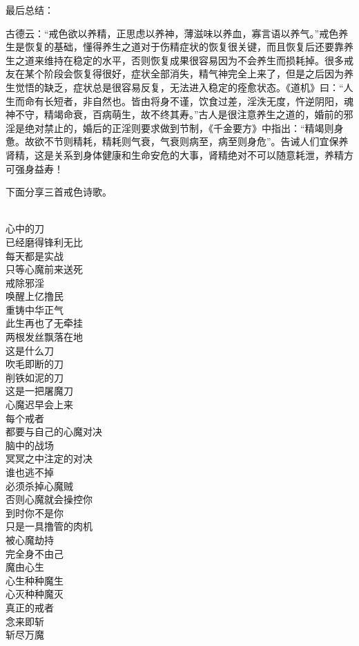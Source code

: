 最后总结：

古德云：“戒色欲以养精，正思虑以养神，薄滋味以养血，寡言语以养气。”戒色养生是恢复的基础，懂得养生之道对于伤精症状的恢复很关键，而且恢复后还要靠养生之道来维持在稳定的水平，否则恢复成果很容易因为不会养生而损耗掉。很多戒友在某个阶段会恢复得很好，症状全部消失，精气神完全上来了，但是之后因为养生觉悟的缺乏，症状总是很容易反复，无法进入稳定的痊愈状态。《道机》曰：“人生而命有长短者，非自然也。皆由将身不谨，饮食过差，淫泆无度，忤逆阴阳，魂神不守，精竭命衰，百病萌生，故不终其寿。”古人是很注意养生之道的，婚前的邪淫是绝对禁止的，婚后的正淫则要求做到节制，《千金要方》中指出：“精竭则身惫。故欲不节则精耗，精耗则气衰，气衰则病至，病至则身危”。告诫人们宜保养肾精，这是关系到身体健康和生命安危的大事，肾精绝对不可以随意耗泄，养精方可强身益寿！

下面分享三首戒色诗歌。

\begin{poem}
    \begin{multicols}{2}
        \begin{center}~\\
            心中的刀 \\ 已经磨得锋利无比 \\ 每天都是实战 \\ 只等心魔前来送死 \\ 戒除邪淫 \\ 唤醒上亿撸民 \\ 重铸中华正气 \\ 此生再也了无牵挂 \\ 两根发丝飘落在地 \\ 这是什么刀 \\ 吹毛即断的刀 \\ 削铁如泥的刀 \\ 这是一把屠魔刀 \\ 心魔迟早会上来 \\ 每个戒者 \\ 都要与自己的心魔对决 \\ 脑中的战场 \\ 冥冥之中注定的对决 \\ 谁也逃不掉 \\ 必须杀掉心魔贼 \\ 否则心魔就会操控你 \\ 到时你不是你 \\ 只是一具撸管的肉机 \\ 被心魔劫持 \\ 完全身不由己 \\ 魔由心生 \\ 心生种种魔生 \\ 心灭种种魔灭 \\ 真正的戒者 \\ 念来即斩 \\ 斩尽万魔
        \end{center}
    \end{multicols}
\end{poem}

